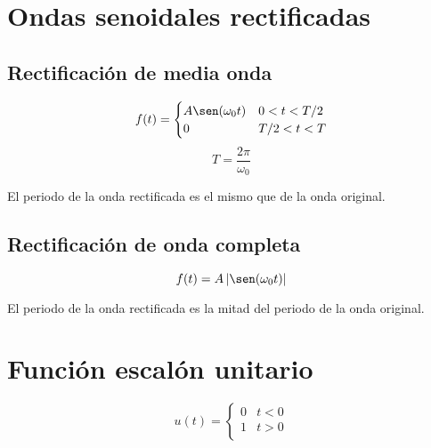 \section{Ondas senoidales rectificadas}
\subsection{Rectificación de media onda}
\begin{equation*}
    f(t)=\begin{cases}
        A\sen(\omega_0 t) & 0<t<T/2\\
        0                 & T/2<t<T\\
    \end{cases}
\end{equation*}
\begin{equation*}
    T=\frac{2\pi}{\omega_0}
\end{equation*}
\begin{figure}[H]
    \centering
    
\end{figure}

El periodo de la onda rectificada es el mismo que de la onda original.

\subsection{Rectificación de onda completa}
\begin{equation*}
    f(t)=A\,|\sen(\omega_0 t)|
\end{equation*}
\begin{figure}[H]
    \centering
    
\end{figure}

El periodo de la onda rectificada es la mitad del periodo de la onda original.

\section{Función escalón unitario}
\begin{equation}
    u(t)=\begin{cases}
        0 & t<0\\
        1 & t>0\\
    \end{cases}
\end{equation}
\begin{figure}[H]
    \centering
    
\end{figure}

